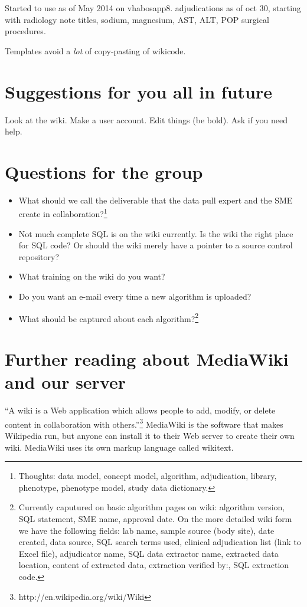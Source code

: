 \documentclass{tufte-handout}
\begin{document}
Started to use as of May 2014 on vhabosapp8. adjudications as of oct
30, starting with radiology note titles, sodium, magnesium, AST, ALT,
POP surgical procedures.

Templates avoid a \emph{lot} of copy-pasting of wikicode.

\section{Suggestions for you all in future}

Look at the wiki. Make a user account. Edit things (be bold). Ask if
you need help.

\section{Questions for the group}

\begin{itemize}

\item What should we call the deliverable that the data pull expert
  and the SME create in collaboration?\footnote{Thoughts: data
    model, concept model, algorithm, adjudication, library, phenotype,
    phenotype model, study data dictionary.}

\item Not much complete SQL is on the wiki currently. Is the wiki the
  right place for SQL code? Or should the wiki merely have a pointer
  to a source control repository?

\item What training on the wiki do you want?

\item Do you want an e-mail every time a new algorithm is uploaded?

\item What should be captured about each algorithm?\footnote{Currently
  caputured on basic algorithm pages on wiki: algorithm version, SQL
  statement, SME name, approval date. On the more detailed wiki form
  we have the following fields: lab name, sample source (body site),
  date created, data source, SQL search terms used, clinical
  adjudication list (link to Excel file), adjudicator name, SQL data
  extractor name, extracted data location, content of extracted data,
  extraction verified by:, SQL extraction code.}

\end{itemize}

\section{Further reading about MediaWiki and our server}

``A wiki is a Web application which allows people to add, modify, or
delete content in collaboration with
others.''\footnote{http://en.wikipedia.org/wiki/Wiki} MediaWiki is the
software that makes Wikipedia run, but anyone can install it to their
Web server to create their own wiki. MediaWiki uses its own markup
language called wikitext.
\end{document}
